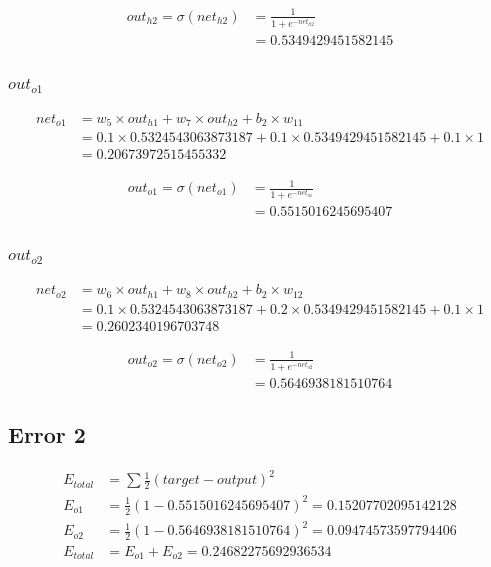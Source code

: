 \documentclass{article}
\begin{document}
\begin{align*}
    out_{h2} = \sigma(net_{h2}) & = \frac{1}{1 + e^{-net_{h2}}} \\
 &= 0.5349429451582145
\end{align*}

\subsubsection{$out_{o1}$}

\begin{align*}
    net_{o1} & = w_{5} \times out_{h1} + w_{7} \times out_{h2} + b_{2} \times w_{11} \\
    & = 0.1 \times 0.5324543063873187 + 0.1 \times  0.5349429451582145 + 0.1 \times 1 \\
    & = 0.20673972515455332
\end{align*}

\begin{align*}
    out_{o1} = \sigma(net_{o1}) & = \frac{1}{1 + e^{-net_{o1}}} \\
    & = 0.5515016245695407
\end{align*}

\subsubsection{$out_{o2}$}
\begin{align*}
    net_{o2} & = w_{6} \times out_{h1} + w_{8} \times out_{h2} + b_{2} \times w_{12} \\
    & = 0.1 \times 0.5324543063873187 + 0.2 \times  0.5349429451582145 + 0.1 \times 1 \\
    & = 0.2602340196703748
\end{align*}

\begin{align*}
    out_{o2} = \sigma(net_{o2}) & = \frac{1}{1 + e^{-net_{o2}}} \\
    & = 0.5646938181510764
\end{align*}

\subsection{Error 2}
\begin{align*}
    E_{total} & = \sum \frac{1}{2} (target-output)^2 \\
    E_{o1} & = \frac{1}{2}(1-0.5515016245695407)^2 = 0.15207702095142128 \\
    E_{o2} & = \frac{1}{2}(1-0.5646938181510764)^2 = 0.09474573597794406 \\
    E_{total} & = E_{o1} + E_{o2} = 0.24682275692936534
\end{align*}
\end{document}
